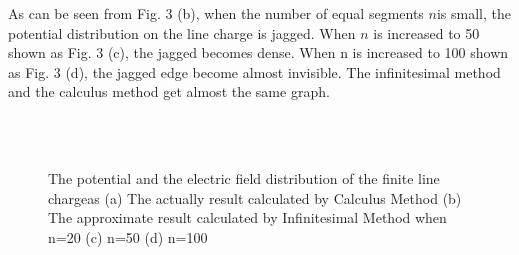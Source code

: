 \documentclass[journal,twocolumn,letterpaper]{IEEEJERM}
\begin{document}
As can be seen from Fig. 3 (b), when the number of equal segments $n $is small, the potential distribution on the line charge is jagged. 
When $n$ is increased to 50 shown as Fig. 3 (c), the jagged becomes dense. When n is increased to 100 shown as Fig. 3 (d), the jagged edge become almost invisible. The infinitesimal method and the calculus method get almost the same graph. 
\begin{figure}[H]   
	\centering	  
	    \label{12}\hfill	  
	\label{22}\\
	    \label{32}\hfill	  
	\label{42}\\
	\caption{The potential and the electric field distribution of the finite line chargeas (a) The actually result calculated by Calculus Method (b) The approximate result calculated by Infinitesimal Method when n=20 (c) n=50 (d) n=100
	}	  
	\label{fig4} 
\end{figure}
\end{document}
